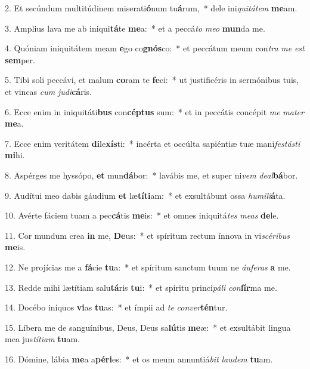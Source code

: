 2. Et secúndum multitúdinem miserati\textbf{ó}num tu\textbf{á}rum,~*  dele ini\textit{qui}\textit{tá}\textit{tem} \textbf{me}am.\

3. Amplius lava me ab iniqui\textbf{tá}te \textbf{me}a:~*  et a peccá\textit{to} \textit{me}\textit{o} \textbf{mun}da me.\

4. Quóniam iniquitátem meam \textbf{e}go co\textbf{gnós}co:~*  et peccátum meum con\textit{tra} \textit{me} \textit{est} \textbf{sem}per.\

5. Tibi soli peccávi, et malum \textbf{co}ram te \textbf{fe}ci:~*  ut justificéris in sermónibus tuis, et vincas \textit{cum} \textit{ju}\textit{di}\textbf{cá}ris.\

6. Ecce enim in iniquitáti\textbf{bus} con\textbf{cép}\textbf{tus} sum:~*  et in peccátis concépit \textit{me} \textit{ma}\textit{ter} \textbf{me}a.\

7. Ecce enim veritátem \textbf{di}le\textbf{xís}ti:~*  incérta et occúlta sapiéntiæ tuæ mani\textit{fes}\textit{tás}\textit{ti} \textbf{mi}hi.\

8. Aspérges me hyssópo, \textbf{et} mun\textbf{dá}bor:~*  lavábis me, et super ni\textit{vem} \textit{de}\textit{al}\textbf{bá}bor.\

9. Audítui meo dabis gáudium \textbf{et} læ\textbf{tí}\textbf{ti}am:~*  et exsultábunt ossa \textit{hu}\textit{mi}\textit{li}\textbf{á}ta.\

10. Avérte fáciem tuam a pec\textbf{cá}tis \textbf{me}is:~*  et omnes iniquitá\textit{tes} \textit{me}\textit{as} \textbf{de}le.\

11. Cor mundum crea \textbf{in} me, \textbf{De}us:~*  et spíritum rectum ínnova in vi\textit{scé}\textit{ri}\textit{bus} \textbf{me}is.\

12. Ne projícias me a \textbf{fá}cie \textbf{tu}a:~*  et spíritum sanctum tuum ne \textit{áu}\textit{fe}\textit{ras} \textbf{a} me.\

13. Redde mihi lætítiam salu\textbf{tá}ris \textbf{tu}i:~*  et spíritu princi\textit{pá}\textit{li} \textit{con}\textbf{fír}ma me.\

14. Docébo iníquos \textbf{vi}as \textbf{tu}as:~*  et ímpii ad \textit{te} \textit{con}\textit{ver}\textbf{tén}tur.\

15. Líbera me de sanguínibus, Deus, Deus sa\textbf{lú}tis \textbf{me}æ:~*  et exsultábit lingua mea jus\textit{tí}\textit{ti}\textit{am} \textbf{tu}am.\

16. Dómine, lábia \textbf{me}a a\textbf{pé}\textbf{ri}es:~*  et os meum annuntiá\textit{bit} \textit{lau}\textit{dem} \textbf{tu}am.\

